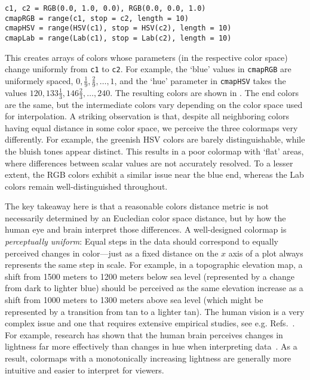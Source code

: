 \begin{listing}[h]
\begin{verbatim} 
c1, c2 = RGB(0.0, 1.0, 0.0), RGB(0.0, 0.0, 1.0)
cmapRGB = range(c1, stop = c2, length = 10) 
cmapHSV = range(HSV(c1), stop = HSV(c2), length = 10) 
cmapLab = range(Lab(c1), stop = Lab(c2), length = 10) 
\end{verbatim}
\end{listing}

This creates arrays of colors whose parameters (in the respective color space) change uniformly from \verb|c1| to \verb|c2|. For example, the `blue' values in \verb|cmapRGB| are uniformely spaced, $0,\frac{1}{9},\frac{2}{9},\ldots,1$, and the `hue' parameter in \verb|cmapHSV| takes the values $120,133\frac{1}{3},146\frac{2}{3},\ldots,240$.
The resulting colors are shown in . 
The end colors are the same, but the intermediate colors vary depending on the color space used for interpolation. A striking observation is that, despite all neighboring colors having equal distance in some color space, we perceive the three colormaps very differently. For example, the greenish HSV colors are barely distinguishable, while the bluish tones appear distinct. This results in a poor colormap with `flat' areas, where differences between scalar values are not accurately resolved. To a lesser extent, the RGB colors exhibit a similar issue near the blue end, whereas the Lab colors remain well-distinguished throughout.

The key takeaway here is that a reasonable colors distance metric is not necessarily determined by an Eucledian color space distance, but by how the human eye and brain interpret those differences. A well-designed colormap is \emph{perceptually uniform}: Equal steps in the data should correspond to equally perceived changes in color---just as a fixed distance on the $x$ axis of a plot always represents the same step in scale. For example, in a topographic elevation map, a shift from 1500 meters to 1200 meters below sea level (represented by a change from dark to lighter blue) should be perceived as the same elevation increase as a shift from 1000 meters to 1300 meters above sea level (which might be represented by a transition from tan to a lighter tan).
The human vision is a very complex issue and one that requires extensive empirical studies, see e.g. Refs.~\cite{rogowitz1996,mullen1985,crameri2020}. For example, research has shown that the human brain perceives changes in lightness far more effectively than changes in hue when interpreting data~\cite{rogowitz1996}. As a result, colormaps with a monotonically increasing lightness are generally more intuitive and easier to interpret for viewers.

